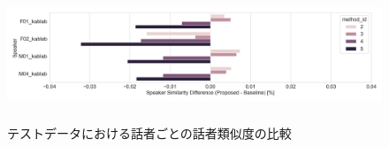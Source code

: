 \documentclass[12pt]{jarticle}
\numberwithin{equation}{section}    %
\numberwithin{figure}{section}      %
\numberwithin{table}{section}      %
\begin{document}
\begin{figure}[bt]
    \centering
    \includegraphics[height=40mm]{./figure/sec4/obj_metrics/spk_sim_speaker_wise_comparison.png}
    \caption{テストデータにおける話者ごとの話者類似度の比較}
    \label{sec4:fig:spk_sim_speaker_wise_comparison}
\end{figure}

\end{document}
